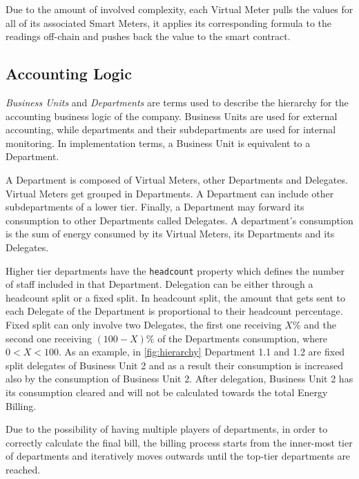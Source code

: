 Due to the amount of involved complexity, each Virtual Meter pulls the values for all of its associated Smart Meters, it applies its corresponding formula to the readings off-chain and pushes back the value to the smart contract.

\subsection{Accounting Logic} \label{billing}

\textit{Business Units} and \textit{Departments} are terms used to describe the hierarchy for the accounting business logic of the company. Business Units are used for external accounting, while departments and their subdepartments are used for internal monitoring. In implementation terms, a Business Unit is equivalent to a Department.

A Department is composed of Virtual Meters, other Departments and Delegates. Virtual Meters get grouped in Departments. A Department can include other subdepartments of a lower tier. Finally, a Department may forward its consumption to other Departments called Delegates. A department's consumption is the sum of energy consumed by its Virtual Meters, its Departments and its Delegates. 



Higher tier departments have the \texttt{headcount} property which defines the number of staff included in that Department. Delegation can be either through a headcount split or a fixed split. In headcount split, the amount that gets sent to each Delegate of the Department is proportional to their headcount percentage. Fixed split can only involve two Delegates, the first one receiving $X\%$ and the second one receiving $(100-X)\%$ of the Departments consumption, where $0<X<100$. As an example, in \ref{fig:hierarchy} Department 1.1 and 1.2 are fixed split delegates of Business Unit 2 and as a result their consumption is increased also by the consumption of Business Unit 2. After delegation, Business Unit 2 has its consumption cleared and will not be calculated towards the total Energy Billing.



Due to the possibility of having multiple players of departments, in order to correctly calculate the final bill, the billing process starts from the inner-most tier of departments and iteratively moves outwards until the top-tier departments are reached.

